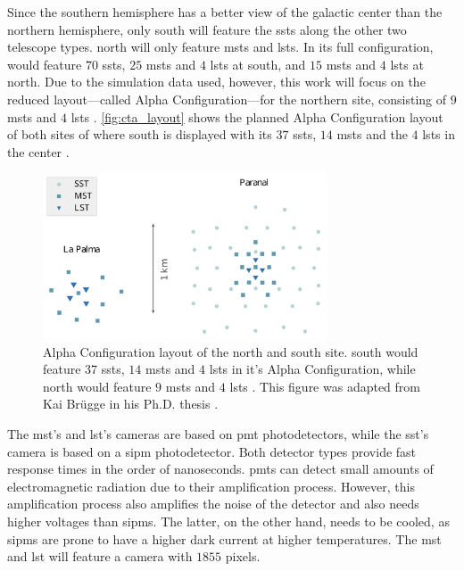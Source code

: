 Since the southern hemisphere has a better view of the galactic center than the northern hemisphere,
only \cta{} south will feature the \glspl{sst} along the other two telescope types. \cta{} north
will only feature \glspl{mst} and \glspl{lst}. In its full configuration, \cta{} would feature
\(\num{70}\) \glspl{sst}, \(\num{25}\) \glspl{mst} and \(\num{4}\) \glspl{lst} at \cta{} south,
and \(\num{15}\) \glspl{mst} and \(\num{4}\) \glspl{lst} at \cta{} north. Due to the simulation data used,
however, this work will focus on the reduced layout---called Alpha Configuration---for the northern site,
consisting of \(\num{9}\) \glspl{mst} and \(\num{4}\) \glspl{lst} \cite{cta_north_layout}.
\autoref{fig:cta_layout} shows the planned Alpha Configuration layout of both sites of \cta{} where
\cta{} south is displayed with its \(\num{37}\) \glspl{sst}, \(\num{14}\) \glspl{mst} and the
\(\num{4}\) \glspl{lst} in the center \cite{cta_south_layout}.
\begin{figure}
    \centering
    \includegraphics[width=0.75\textwidth]{graphics/cta_layout.pdf}
    \caption{Alpha Configuration layout of the \cta{} north and \cta{}
    south site. \cta{} south would feature \(\num{37}\) \glspl{sst}, \(\num{14}\) \glspl{mst} and
    \(\num{4}\) \glspl{lst} \cite{cta_south_layout} in it's Alpha Configuration, while \cta{} north would
    feature \(\num{9}\) \glspl{mst} and \(\num{4}\) \glspl{lst} \cite{cta_north_layout}.
    This figure was adapted from Kai Br\"ugge in his Ph.D. thesis \cite{bruegge_thesis}.}
    \label{fig:cta_layout}
\end{figure}

The \gls{mst}'s and \gls{lst}'s cameras are based on \gls{pmt} photodetectors, while the \gls{sst}'s
camera is based on a \gls{sipm} photodetector. Both detector types provide fast response times in the
order of nanoseconds. \glspl{pmt} can detect small amounts of electromagnetic radiation due to their
amplification process. However, this amplification process also amplifies the noise of the detector
and also needs higher voltages than \glspl{sipm}. The latter, on the other hand, needs to be cooled,
as \glspl{sipm} are prone to have a higher dark current at higher temperatures. The \gls{mst} and
\gls{lst} will feature a camera with \(\num{1855}\) pixels.

